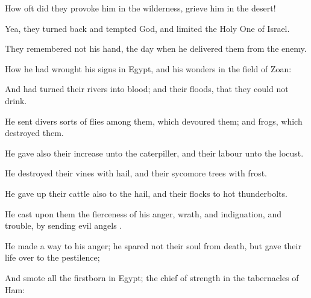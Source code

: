 {\Q {}How oft did they
provoke him in the
wilderness,
{}
grieve him in the
desert!


\par }{\Q {}Yea, they turned
back and
tempted
God, and
limited the Holy
One of
Israel.


\par }{\Q {}They
remembered not his
hand,
{} the
day when he
delivered them from the
enemy.


\par }{\Q {}How he had
wrought his
signs in
Egypt, and his
wonders in the
field of
Zoan:


\par }{\Q {}And had
turned their
rivers into
blood; and their
floods, that they could not
drink.


\par }{\Q {}He
sent divers sorts of
flies among them, which
devoured them; and
frogs, which
destroyed them.


\par }{\Q {}He
gave also their
increase unto the
caterpiller, and their
labour unto the
locust.


\par }{\Q {}He
destroyed their
vines with
hail, and their sycomore
trees with
frost.


\par }{\Q {}He gave
up their
cattle also to the
hail, and their
flocks to hot
thunderbolts.


\par }{\Q {}He
cast upon them the
fierceness of his
anger,
wrath, and
indignation, and
trouble, by
sending
evil
angels
{}.


\par }{\Q {}He
made a
way to his
anger; he
spared not their
soul from
death, but
gave their
life
over to the
pestilence;


\par }{\Q {}And
smote all the
firstborn in
Egypt; the
chief of
{}
strength in the
tabernacles of
Ham:


}
